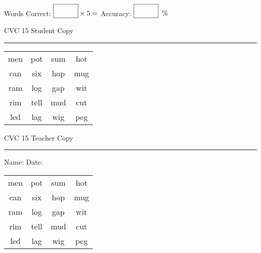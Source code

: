 \documentclass{memoir}
\begin{document}
\small

Words Correct: $\fbox{\phantom{\huge 100}} \times 5 = $ Accuracy: $\fbox{\phantom{\huge 100}}\;\; \%$ 

\vfill

\newpage


\footnotesize \noindent
CVC 15 \hfill Student Copy
\smallskip
\hrule

\Large

\setlength{\tabcolsep}{14pt}
\def\arraystretch{2}

{\selectfont


\begin{vplace}[0.5]
\begin{center}
\begin{tabular}{cccc}
men & pot & sum & hot \\
can & six & hop & mug \\
ram & log & gap & wit \\
rim & tell & mud & cut \\
led & lag & wig & peg \\
\end{tabular}
\end{center}
\end{vplace}

}

\newpage

\footnotesize \noindent
CVC 15 \hfill Teacher Copy
\smallskip
\hrule

\small

\vfill

\noindent
Name: \underline{\hspace{1.75in}} \hfill Date: \underline{\hspace{1in}}

\Large

{\selectfont


\begin{vplace}[0.5]
\begin{center}
\begin{tabular}{cccc}
men & pot & sum & hot \\
can & six & hop & mug \\
ram & log & gap & wit \\
rim & tell & mud & cut \\
led & lag & wig & peg \\
\end{tabular}
\end{center}
\end{vplace}



}
\end{document}
